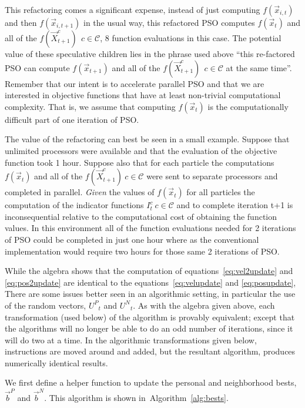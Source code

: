 \documentclass[journal,letterpaper]{IEEEtran}
\newcommand{\alg}[1]{Algorithm~\ref{alg:#1}}
\providecommand{\pers}{\ensuremath{P}}
\providecommand{\neigh}{\ensuremath{N}}
\providecommand{\nURand}{\ensuremath{U^\neigh}}
\providecommand{\pURand}{\ensuremath{U^\pers}}
\providecommand{\ppos}{\ensuremath{\Vec{x}}}
\providecommand{\nbest}{\ensuremath{\Vec{b}^\neigh}}
\providecommand{\pbest}{\ensuremath{\Vec{b}^\pers}}
\providecommand{\ofunc}{\ensuremath{f}}
\providecommand{\indic}{\ensuremath{I}}
\providecommand{\specpos}{\ensuremath{\vec{X}}}
\providecommand{\caseset}{\ensuremath{\mathcal{C}}}
\begin{document}
This refactoring comes a significant expense, instead of just computing
$\ofunc(\ppos_{i,t})$ and then $\ofunc(\ppos_{i,t+1})$ in the usual way, this refactored PSO
computes $\ofunc(\ppos_{t})$ and all 
of the $\ofunc(\specpos_{t+1}^{c}) \ \ c \in \caseset$, 8 function evaluations in this case.
The potential value of these speculative children lies in the phrase used above
``this re-factored PSO
can compute $\ofunc(\ppos_{t+1})$ and all 
of the $\ofunc(\specpos_{t+1}^{c}) \ \ c \in \caseset$ at the same time''. 
Remember that our intent is to accelerate parallel PSO and that we
are interested in objective functions that have at least non-trivial computational
complexity.
That is, we assume that computing
$\ofunc(\ppos_{t})$ is the computationally difficult part of one iteration of PSO.

The value of the refactoring can best be seen in a small example.
Suppose that unlimited processors were available and that the evaluation of 
the objective function took 1 hour. Suppose also that for each particle
the computations
$\ofunc(\ppos_{t})$ and all 
of the $\ofunc(\specpos_{t+1}^{c}) \ c \in \caseset$ were sent to separate
processors and completed in parallel.
\emph{Given} the values 
of $\ofunc(\ppos_{t})$ for all particles
the computation of the indicator functions $\indic_{t}^{c} \ c \in \caseset$ and to complete iteration t+1
is inconsequential relative to the computational cost of obtaining the function values. 
In this environment all of the function evaluations needed for 2 iterations of PSO
could be completed in just one hour where as the conventional implementation would
require two hours for those same 2 iterations of PSO.

While the algebra shows that the computation of 
equations~\eqref{eq:vel2update} and \eqref{eq:pos2update} are identical to the 
equations~\eqref{eq:velupdate} and \eqref{eq:posupdate},
There are some issues better seen in an algorithmic setting, in particular the use of the random
vectors, 
$\pURand_{t}$ and $\nURand_{t}$.
As with the algebra given above, each transformation (used below) of the algorithm is
provably equivalent; except that the algorithms will no longer be able to do an odd number of iterations,
since it will do two at a time. In the algorithmic transformations given below,
instructions are moved around and added, but the
resultant algorithm, produces numerically identical results.

We first define a helper function to update the personal and neighborhood bests, $\pbest$ and $\nbest$.
This algorithm is shown in~\alg{bests}.
\end{document}
